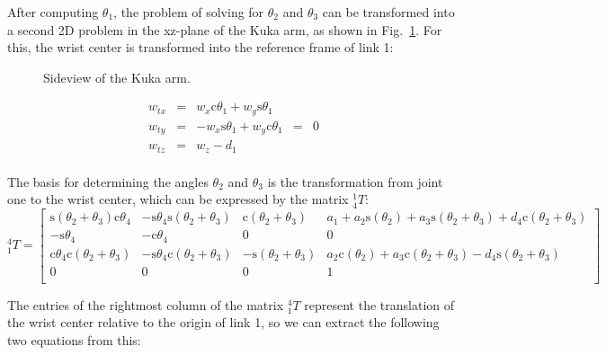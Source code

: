 \documentclass[twoside]{article}
\renewcommand{\c}{\text{c}}
\newcommand{\s}{\text{s}}
\newcommand{\T}[2]{\mbox{$_{#2}^{#1}{T}$}}
\newcommand{\figref}[1]{Fig.~\ref{fig:#1}}
\begin{document}
After computing $\theta_1$, the problem of solving for $\theta_2$ and $\theta_3$ can be
transformed into a second 2D problem in the xz-plane of the Kuka arm, as shown in \figref{sideview}.
For this, the wrist center is transformed into the reference frame of link 1:
\begin{figure}[ht]
  \centering
  \caption{Sideview of the Kuka arm.}
  \label{fig:sideview}
\end{figure}

\begin{equation}
\begin{matrix}
  w_{tx} & = & w_x \c\theta_1 + w_y \s\theta_1 & &\\
  w_{ty} & = & - w_x  \s\theta_1 + w_y \c\theta_1 & = &0\\
  w_{tz} & = & w_z - d_1&& \\
\end{matrix}
\end{equation}

\newpage
The basis for determining the angles $\theta_2$ and $\theta_3$ is the transformation from
joint one to the wrist center, which can be expressed by the matrix $\T{1}{4}$:
\begin{equation}
\T{4}{1} =
\begin{bmatrix}
  \s(\theta_2 + \theta_3)\c\theta_4 & -\s\theta_4\s(\theta_2 + \theta_3) & \c(\theta_2 + \theta_3) & a_1 + a_2\s(\theta_2) + a_3\s(\theta_2 + \theta_3) + d_4\c(\theta_2 + \theta_3) \\
  -\s\theta_4 & -\c\theta_4 & 0 & 0 \\
  \c\theta_4\c(\theta_2 + \theta_3) & -\s\theta_4\c(\theta_2 + \theta_3) & -\s(\theta_2 + \theta_3) & a_2\c(\theta_2) + a_3\c(\theta_2 + \theta_3) - d_4\s(\theta_2 + \theta_3) \\
  0 & 0 & 0 & 1\\
  \label{eq:trans14}
\end{bmatrix}
\end{equation}

The entries of the rightmost column of the matrix $\T{4}{1}$ represent the translation of the
wrist center relative to the origin of link 1, so we can extract the following two equations from this:
\end{document}
